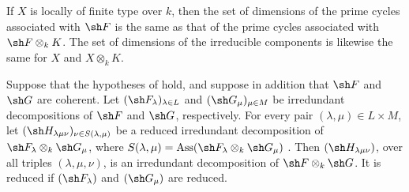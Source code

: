 \begin{corollary}[4.2.8]
\label{IV.4.2.8}
If $X$ is locally of finite type over $k$, then the set of dimensions
of the prime cycles associated with $\sh F$ is the same as that of the
prime cycles associated with $\sh F\otimes_k K$.
The set of dimensions of the irreducible components is likewise the
same for $X$ and $X\otimes_k K$.
\end{corollary}

\begin{proposition}[4.2.9]
\label{IV.4.2.9}
Suppose that the hypotheses of  hold, and suppose in
addition that $\sh F$ and $\sh G$ are coherent.
Let $(\sh F_\lambda)_{\lambda\in L}$ and
$(\sh G_\mu)_{\mu\in M}$ be irredundant decompositions of $\sh F$ and
$\sh G$, respectively.
For every pair $(\lambda,\mu)\in L\times M$, let $(\sh H_{\lambda\mu\nu})_{\nu\in S(\lambda,\mu)}$
be a reduced irredundant decomposition of
$\sh F_\lambda\otimes_k\sh G_\mu$, where $S(\lambda,\mu)
=\operatorname{Ass}(\sh F_\lambda\otimes_k\sh G_\mu)$
.
Then $(\sh H_{\lambda\mu\nu})$, over all triples
$(\lambda,\mu,\nu)$, is an irredundant decomposition of
$\sh F\otimes_k\sh G$.
It is reduced if $(\sh F_\lambda)$ and $(\sh G_\mu)$ are reduced.
\end{proposition}

